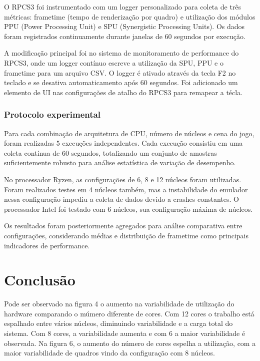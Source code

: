\documentclass{acm_proc_article-sp}
\begin{document}
O RPCS3 foi instrumentado com um logger personalizado para coleta de
três métricas: frametime (tempo de renderização por quadro) e utilização
dos módulos PPU (Power Processing Unit) e SPU (Synergistic Processing
Units). Os dados foram registrados continuamente durante janelas de 60
segundos por execução.

A modificação principal foi no sistema de monitoramento de performance
do RPCS3, onde um logger contínuo escreve a utilização da SPU, PPU e o
frametime para um arquivo CSV. O logger é ativado através da tecla F2 no
teclado e se desativa automaticamento após 60 segundos. Foi adicionado
um elemento de UI nas configurações de atalho do RPCS3 para remapear a
técla.

\subsubsection{Protocolo experimental}\label{protocolo-experimental}

Para cada combinação de arquitetura de CPU, número de núcleos e cena do
jogo, foram realizadas 5 execuções independentes. Cada execução
consistiu em uma coleta contínua de 60 segundos, totalizando um conjunto
de amostras suficientemente robusto para análise estatística de variação
de desempenho.

No processador Ryzen, as configurações de 6, 8 e 12 núcleos foram
utilizadas. Foram realizados testes em 4 núcleos também, mas a
instabilidade do emulador nessa configuração impediu a coleta de dados
devido a crashes constantes. O processador Intel foi testado com 6
núcleos, sua configuração máxima de núcleos.

Os resultados foram posteriormente agregados para análise comparativa
entre configurações, considerando médias e distribuição de frametime
como principais indicadores de performance.

\section{Conclusão}\label{conclusuxe3o}

Pode ser observado na figura 4 o aumento na variabilidade de utilização
do hardware comparando o múmero diferente de cores. Com 12 cores o
trabalho está espalhado entre vários núcleos, diminuindo variabilidade e
a carga total do sistema. Com 8 cores, a variabilidade aumenta e com 6 a
maior variabilidade é observada. Na figura 6, o aumento do número de
cores espelha a utilização, com a maior variabilidade de quadros vindo
da configuração com 8 núcleos.
\end{document}
